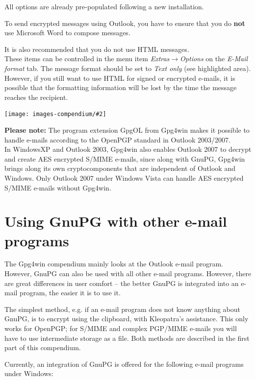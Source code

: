 \documentclass[a4paper,11pt,oneside,openright,titlepage]{scrbook}
\newcommand{\Menu}[1]{\textit{#1}}
\newcommand{\Email}{e-mail}
\newcommand{\IncludeImage}[2][]{
\begin{center}
  \texttt{[image: images-compendium/\#2]}%
\end{center}
}
\begin{document}
All options are already pre-populated following a new installation.

\clearpage
\label{OLandWord}
To send encrypted messages using Outlook, you have to ensure that you
do \textbf{not} use Microsoft Word to compose messages.

It is also recommended that you do not use HTML messages.\\
These items can be controlled in the menu item
\Menu{Extras$\rightarrow$Options} on the \Menu{E-Mail format} tab.
The message format should be set to \Menu{Text only} (see highlighted
area). However, if you still want to use HTML for signed or encrypted
\Email{}s, it is possible that the formatting information will be lost
by the time the message reaches the recipient.

\IncludeImage[width=0.6\textwidth]{sc-gpgol-options-textformat_en}

\textbf{Please note:}
The program extension GpgOL from Gpg4win makes it possible to handle
\Email{}s according to the OpenPGP standard in Outlook 2003/2007.\\ In
WindowsXP and Outlook 2003, Gpg4win also enables Outlook 2007 to
decrypt and create AES encrypted S/MIME \Email{}s, since along with
GnuPG, Gpg4win brings along its own cryptocomponents that are
independent of Outlook and Windows. Only Outlook 2007 under Windows
Vista can handle AES encrypted S/MIME \Email{}s without Gpg4win.


\clearpage
\chapter{Using GnuPG with other \Email{} programs}

\label{ch:plugins}

The Gpg4win compendium mainly looks at the Outlook \Email{} program.
However, GnuPG can also be used with all other \Email{} programs.
However, there are great differences in user comfort -- the better
GnuPG is integrated into an \Email{} program, the easier it is to use
it.

The simplest method, e.g. if an \Email{} program does not know
anything about GnuPG, is to encrypt using the clipboard, with
Kleopatra's assistance. This only works for OpenPGP; for S/MIME and
complex PGP/MIME \Email{}s you will have to use intermediate storage
as a file. Both methods are described in the first part of this
compendium.

Currently, an integration of GnuPG is offered for the following
\Email{} programs under Windows:
\end{document}
